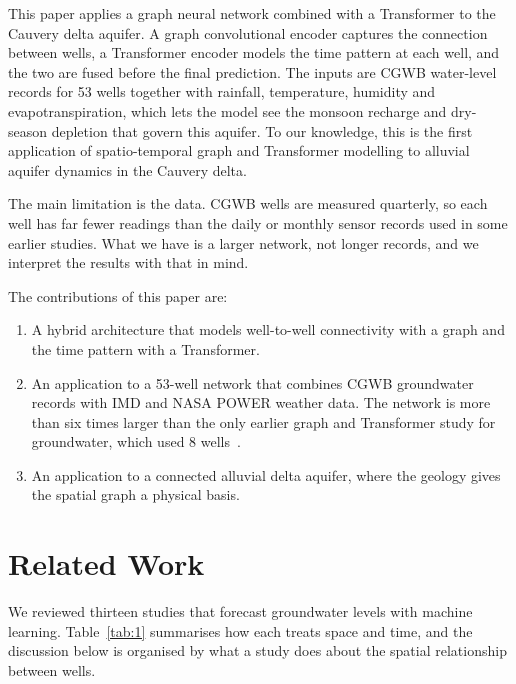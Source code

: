 \documentclass[conference]{IEEEtran}
\providecommand{\tightlist}{\setlength{\itemsep}{0pt}\setlength{\parskip}{0pt}}
\begin{document}
This paper applies a graph neural network combined with a Transformer to the Cauvery delta aquifer. A graph convolutional encoder captures the connection between wells, a Transformer encoder models the time pattern at each well, and the two are fused before the final prediction. The inputs are CGWB water-level records for 53 wells together with rainfall, temperature, humidity and evapotranspiration, which lets the model see the monsoon recharge and dry-season depletion that govern this aquifer. To our knowledge, this is the first application of spatio-temporal graph and Transformer modelling to alluvial aquifer dynamics in the Cauvery delta.

The main limitation is the data. CGWB wells are measured quarterly, so each well has far fewer readings than the daily or monthly sensor records used in some earlier studies. What we have is a larger network, not longer records, and we interpret the results with that in mind.

The contributions of this paper are:

\begin{enumerate}
\def\labelenumi{\arabic{enumi}.}
\tightlist
\item
  A hybrid architecture that models well-to-well connectivity with a graph and the time pattern with a Transformer.
\item
  An application to a 53-well network that combines CGWB groundwater records with IMD and NASA POWER weather data. The network is more than six times larger than the only earlier graph and Transformer study for groundwater, which used 8 wells~\cite{ref2}.
\item
  An application to a connected alluvial delta aquifer, where the geology gives the spatial graph a physical basis.
\end{enumerate}

\section{Related Work}

We reviewed thirteen studies that forecast groundwater levels with machine learning. Table~\ref{tab:1} summarises how each treats space and time, and the discussion below is organised by what a study does about the spatial relationship between wells.
\end{document}
